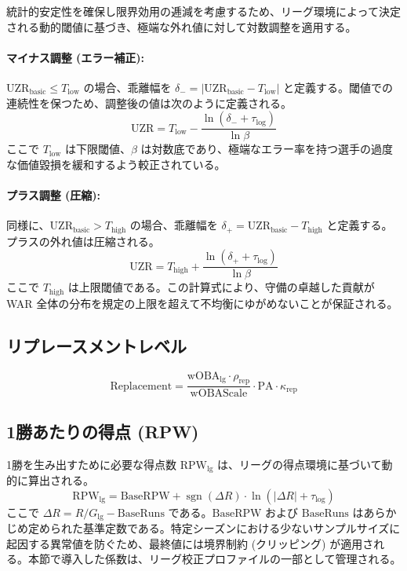 \documentclass[uplatex,a4paper,11pt,dvipdfmx]{jsarticle}
\newcommand{\mvar}[1]{\mathrm{#1}}
\begin{document}
統計的安定性を確保し限界効用の逓減を考慮するため、リーグ環境によって決定される動的閾値に基づき、極端な外れ値に対して対数調整を適用する。

\paragraph{マイナス調整 (エラー補正):}
$\mvar{UZR}_{\text{basic}} \le T_{\text{low}}$ の場合、乖離幅を $\delta_- = \lvert \mvar{UZR}_{\text{basic}} - T_{\text{low}} \rvert$ と定義する。閾値での連続性を保つため、調整後の値は次のように定義される。
\begin{equation}
\mvar{UZR} = T_{\text{low}} - \frac{\ln(\delta_- + \tau_{\log})}{\ln \beta}
\end{equation}
ここで $T_{\text{low}}$ は下限閾値、$\beta$ は対数底であり、極端なエラー率を持つ選手の過度な価値毀損を緩和するよう較正されている。

\paragraph{プラス調整 (圧縮):}
同様に、$\mvar{UZR}_{\text{basic}} > T_{\text{high}}$ の場合、乖離幅を $\delta_+ = \mvar{UZR}_{\text{basic}} - T_{\text{high}}$ と定義する。プラスの外れ値は圧縮される。
\begin{equation}
\mvar{UZR} = T_{\text{high}} + \frac{\ln(\delta_+ + \tau_{\log})}{\ln \beta}
\end{equation}
ここで $T_{\text{high}}$ は上限閾値である。この計算式により、守備の卓越した貢献が WAR 全体の分布を規定の上限を超えて不均衡にゆがめないことが保証される。

\subsection{リプレースメントレベル}
\begin{equation}
\mvar{Replacement} = \frac{\mvar{wOBA}_{\text{lg}} \cdot \rho_{\text{rep}}}{\mvar{wOBAScale}} \cdot \mvar{PA} \cdot \kappa_{\text{rep}}
\end{equation}

\subsection{1勝あたりの得点 (RPW)}
1勝を生み出すために必要な得点数 $\mvar{RPW}_{\text{lg}}$ は、リーグの得点環境に基づいて動的に算出される。
\begin{equation}
\mvar{RPW}_{\text{lg}} = \mvar{BaseRPW} + \operatorname{sgn}(\Delta R) \cdot \ln(|\Delta R| + \tau_{\log})
\end{equation}
ここで $\Delta R = R/G_{\text{lg}} - \mvar{BaseRuns}$ である。$\mvar{BaseRPW}$ および $\mvar{BaseRuns}$ はあらかじめ定められた基準定数である。特定シーズンにおける少ないサンプルサイズに起因する異常値を防ぐため、最終値には境界制約 (クリッピング) が適用される。本節で導入した係数は、リーグ校正プロファイルの一部として管理される。
\end{document}
